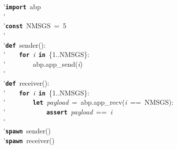 \'\>\texttt{\textbf{import}}~abp\\

\'\>\\

\'\>\texttt{\textbf{const}}~NMSGS~=~5\\

\'\>\\

\'\>\texttt{\textbf{def}}~sender():\\

\'\>~~~~\texttt{\textbf{for}}~\textit{i}~\texttt{\textbf{in}}~\{1..NMSGS\}:\\

\'\>~~~~~~~~abp.app\_send(\textit{i})\\

\'\>~~~~\\

\'\>\texttt{\textbf{def}}~receiver():\\

\'\>~~~~\texttt{\textbf{for}}~\textit{i}~\texttt{\textbf{in}}~\{1..NMSGS\}:\\

\'\>~~~~~~~~\texttt{\textbf{let}}~\textit{payload}~=~abp.app\_recv(\textit{i}~==~NMSGS):\\

\'\>~~~~~~~~~~~~\texttt{\textbf{assert}}~\textit{payload}~==~\textit{i}\\

\'\>\\

\'\>\texttt{\textbf{spawn}}~sender()\\

\'\>\texttt{\textbf{spawn}}~receiver()